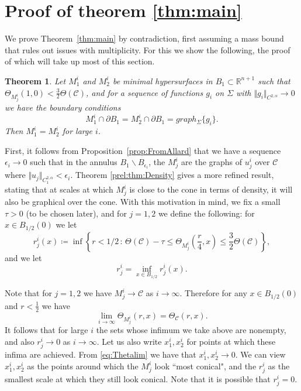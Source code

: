 \documentclass[12pt, reqno ]{amsart}
\newtheorem{theorem}{Theorem}[section]
\numberwithin{equation}{section}
\begin{document}
\section{Proof of theorem \ref{thm:main}} \label{sec:mainproof}

We  prove Theorem~\ref{thm:main}  by contradiction, first assuming a mass bound that rules out issues with multiplicity. For this we show the following, the proof of which will take up most of this section. 

\begin{theorem}\label{main:maintheo}
Let $M_1^i$ and $M_2^i$ be minimal hypersurfaces in $B_1\subset \mathbb R^{n+1}$ such that $\Theta_{M_j^i}(1,0)< \frac{3}{2}\Theta(\mathcal C)$, and for a sequence of functions $g_i$ on $\Sigma$ with $\Vert g_i\Vert_{C^{2,\alpha}}\to 0$ we have the boundary conditions
\[ M_1^i \cap \partial B_1=M_2^i\cap \partial B_1=graph_{\Sigma}\{ g_i\}. \]
Then $M_1^i=M_2^i$ for large $i$.
\end{theorem}

First, it follows from Proposition~\ref{prop:FromAllard} that 
we have a sequence $\epsilon_i \to 0$ such that in the annulus $B_1\backslash B_{\epsilon_i}$, the $M^i_j$ are the graphs of $u^i_j$ over $\mathcal{C}$ where $\Vert u_j\Vert_{C^{2,\alpha}_1} < \epsilon_i$. 
Theorem \ref{prel:thm:Density} gives a more refined result, stating  that at scales at which $M_j^i$ is close to the cone in terms of density, it will also be graphical over the cone. With this motivation in mind, we fix a small $\tau > 0$ (to be chosen later), and for $j=1,2$ we define the following:  for $x\in B_{1/2}(0)$ we let
\[ 
r_j^i(x)\coloneqq\inf \left\{r < 1/2\,:\,\Theta(\mathcal C)-\tau\leq\Theta_{M_j^i}\left(\frac{r}{4}, x\right)\leq\frac{3}{2}\Theta(\mathcal C) \right\}, 
\]
and we let 
\begin{equation}\label{main:r_1}
r_j^i = \inf_{x\in B_{1/2}} r^i_j(x). 
\end{equation}

Note that for $j=1,2$ we have $M_j^i\rightarrow \mathcal C$ as $i\to\infty$. Therefore for any $x\in B_{1/2}(0)$ and $r < \frac{1}{2}$ we have
\begin{equation}\label{eq:Thetalim}
    \lim_{i\rightarrow\infty}\Theta_{M_j^i} (r, x)=\Theta_{\mathcal{C}}(r,x).
\end{equation}
It follows that for large $i$ the sets whose infimum we take above are nonempty, and also $r^i_j\to 0$ as $i\to\infty$. 
Let us also write $x^i_1, x^i_2$ for points at which these infima are achieved. From \eqref{eq:Thetalim} we  have that
$x^i_1, x^i_2 \to 0$. We can view $x^i_1, x^i_2$ as the points around which the $M^i_j$ look ``most conical", and the $r^i_j$ as the smallest scale at which they still look conical. Note that it is possible that $r^i_j = 0$. 
\end{document}
